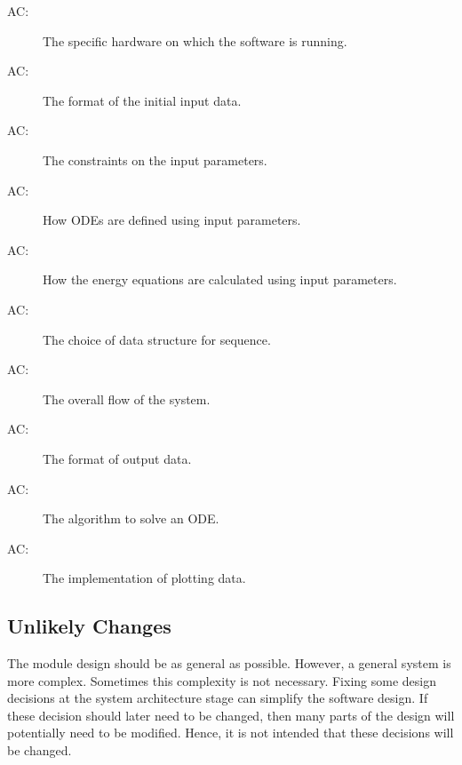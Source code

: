 \documentclass[12pt, titlepage]{article}
\newcounter{acnum}
\newcommand{\actheacnum}{AC\theacnum}
\begin{document}
\begin{description}
\item[ \actheacnum \label{1_ac}:] The specific
  hardware on which the software is running.
\item[ \actheacnum \label{2_ac}:] The format of the initial input data.
\item[ \actheacnum \label{3_ac}:] The constraints on the input parameters. 
\item[ \actheacnum \label{4_ac}:] How ODEs are defined using input parameters. 
\item[ \actheacnum \label{5_ac}:] How the energy equations are calculated using input parameters. 
\item[ \actheacnum \label{6_ac}:] The choice of data structure for sequence.
\item[ \actheacnum \label{7_ac}:] The overall flow of the system. 
\item[ \actheacnum \label{8_ac}:] The format of output data. 
\item[ \actheacnum \label{9_ac}:] The algorithm to solve an ODE. 
\item[ \actheacnum \label{10_ac}:] The implementation of plotting data. 


\end{description}

\subsection{Unlikely Changes} \label{SecUchange}

The module design should be as general as possible. However, a general system is
more complex. Sometimes this complexity is not necessary. Fixing some design
decisions at the system architecture stage can simplify the software design. If
these decision should later need to be changed, then many parts of the design
will potentially need to be modified. Hence, it is not intended that these
decisions will be changed.
\end{document}
